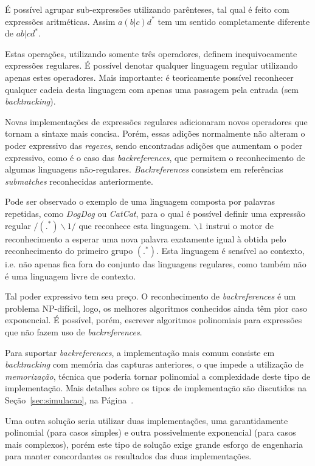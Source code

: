 \documentclass[a4paper,12pt,oneside,onecolumn]{uerj}
\begin{document}
É possível agrupar sub-expressões utilizando parênteses, tal qual é feito com expressões aritméticas. Assim $a(b|c)d^*$ tem um sentido completamente diferente de $ab|cd^*$.

Estas operações, utilizando somente três operadores, definem inequivocamente expressões regulares. É possível denotar qualquer linguagem regular utilizando apenas estes operadores. Mais importante: é teoricamente possível reconhecer qualquer cadeia desta linguagem com apenas uma passagem pela entrada (sem \emph{backtracking}). 

Novas implementações de expressões regulares adicionaram novos operadores que tornam a sintaxe mais concisa. Porém, essas adições normalmente não alteram o poder expressivo das \emph{regexes}, sendo encontradas adições que aumentam o poder expressivo, como é o caso das \emph{backreferences}, que permitem o reconhecimento de algumas linguagens não-regulares. \emph{Backreferences} consistem em referências \emph{submatches} reconhecidas anteriormente.

Pode ser observado o exemplo de uma linguagem composta por palavras repetidas, como \emph{DogDog} ou \emph{CatCat}, para o qual é possível definir uma expressão regular $/(.^*)\backslash 1/$ que reconhece esta linguagem. $\backslash 1$ instrui o motor de reconhecimento a esperar uma nova palavra exatamente igual à obtida pelo reconhecimento do primeiro grupo $(.^*)$. Esta linguagem é sensível ao contexto, i.e. não apenas fica fora do conjunto das linguagens regulares, como também não é uma linguagem livre de contexto.

Tal poder expressivo tem seu preço. O reconhecimento de \emph{backreferences} é um problema NP-difícil, logo, os melhores algoritmos conhecidos ainda têm pior caso exponencial. É possível, porém, escrever algoritmos polinomiais para expressões que não fazem uso de \emph{backreferences}.

Para suportar \emph{backreferences}, a implementação mais comum consiste em \emph{backtracking} com memória das capturas anteriores, o que impede a utilização de \emph{memorização}, técnica que poderia tornar polinomial a complexidade deste tipo de implementação. Mais detalhes sobre os tipos de implementação são discutidos na Seção~\ref{sec:simulacao}, na Página~\pageref{sec:simulacao}.

Uma outra solução seria utilizar duas implementações, uma garantidamente polinomial (para casos simples) e outra possivelmente exponencial (para casos mais complexos), porém este tipo de solução exige grande esforço de engenharia para manter concordantes os resultados das duas implementações.
\end{document}
